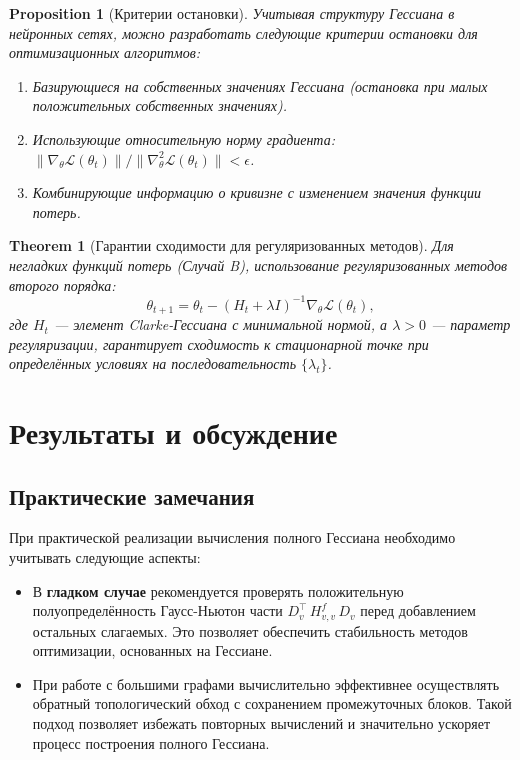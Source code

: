 \documentclass[11pt]{article}
\newtheorem{theorem}{Theorem}
\newtheorem{proposition}{Proposition}
\begin{document}
\begin{proposition}[Критерии остановки]
  Учитывая структуру Гессиана в нейронных сетях, можно разработать следующие критерии остановки для
  оптимизационных алгоритмов:
  \begin{enumerate}
    \item Базирующиеся на собственных значениях Гессиана (остановка при малых положительных собственных значениях).
    \item Использующие относительную норму градиента: $\|\nabla_\theta \mathcal{L}(\theta_t)\| /
      \|\nabla^2_\theta \mathcal{L}(\theta_t)\| < \epsilon$.
    \item Комбинирующие информацию о кривизне с изменением значения функции потерь.
  \end{enumerate}
\end{proposition}

\begin{theorem}[Гарантии сходимости для регуляризованных методов]
  Для негладких функций потерь (Случай B), использование регуляризованных методов второго порядка:
  \[
    \theta_{t+1} = \theta_t - (H_t + \lambda I)^{-1} \nabla_\theta \mathcal{L}(\theta_t),
  \]
  где $H_t$ — элемент Clarke-Гессиана с минимальной нормой, а $\lambda > 0$ — параметр регуляризации,
  гарантирует сходимость к стационарной точке при определённых условиях на последовательность $\{\lambda_t\}$.
\end{theorem}

\section{Результаты и обсуждение}

\subsection{Практические замечания}

При практической реализации вычисления полного Гессиана необходимо учитывать следующие аспекты:

\begin{itemize}
  \item В \textbf{гладком случае} рекомендуется проверять положительную полуопределённость Гаусс-Ньютон части
    $D_v^\top\,H^f_{v,v}\,D_v$ перед добавлением остальных слагаемых. Это позволяет обеспечить стабильность
    методов оптимизации, основанных на Гессиане.

  \item При работе с большими графами вычислительно эффективнее осуществлять обратный топологический обход с
    сохранением промежуточных блоков. Такой подход позволяет избежать повторных вычислений и значительно
    ускоряет процесс построения полного Гессиана.
\end{itemize}
\end{document}
